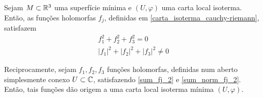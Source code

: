 \begin{lema}\label{lema_fj_2}
	Sejam $M \subset \mathbb{R}^3$ uma superfície mínima e $(U, \varphi)$ uma carta local isoterma. Então, as funções holomorfas $f_j$, definidas em \ref{carta_isoterma_cauchy-riemann}, satisfazem
	\begin{gather}\label{sum_fj_2}
		f_1^2 + f_2^2 + f_3^2 = 0\\ \label{sum_norm_fj_2}
		|f_1|^2 + |f_2|^2 + |f_3|^2 \neq 0
	\end{gather}
	
	Reciprocamente, sejam $f_1, f_2, f_3$ funções holomorfas, definidas num aberto simplesmente conexo $U \subset \mathbb{C}$, satisfazendo \ref{sum_fj_2} e \ref{sum_norm_fj_2}. Então, tais funções dão origem a uma carta local isoterma mínima $(U, \varphi)$.
\end{lema}

